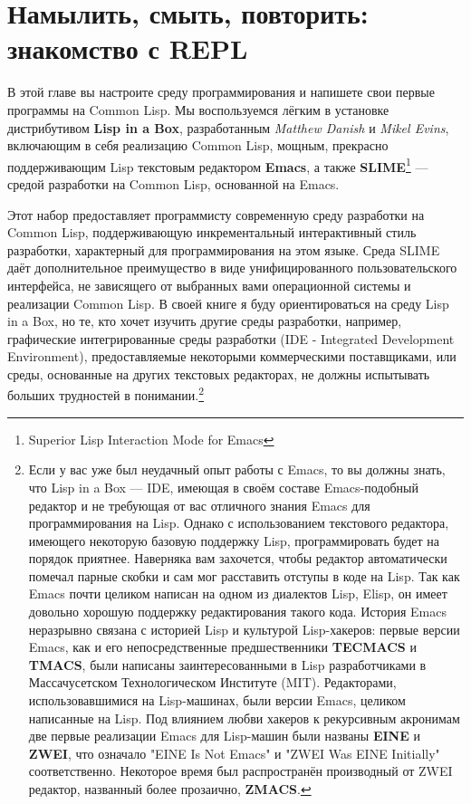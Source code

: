 \chapter{Намылить, смыть, повторить: знакомство с REPL}
\label{ch:02}

В этой главе вы настроите среду программирования и напишете свои первые программы на
Common Lisp. Мы воспользуемся лёгким в установке дистрибутивом \textbf{Lisp in a Box},
разработанным \textit{Matthew Danish} и \textit{Mikel Evins}, включающим в себя реализацию
Common Lisp, мощным, прекрасно поддерживающим Lisp текстовым редактором \textbf{Emacs}, а
также \textbf{SLIME}\footnote{Superior Lisp Interaction Mode for Emacs} --- средой
разработки на Common Lisp, основанной на Emacs.

Этот набор предоставляет программисту современную среду разработки на Common Lisp,
поддерживающую инкрементальный интерактивный стиль разработки, характерный для
программирования на этом языке. Среда SLIME даёт дополнительное преимущество в виде
унифицированного пользовательского интерфейса, не зависящего от выбранных вами
операционной системы и реализации Common Lisp. В своей книге я буду ориентироваться на
среду Lisp in a Box, но те, кто хочет изучить другие среды разработки, например,
графические интегрированные среды разработки (IDE - Integrated Development Environment),
предоставляемые некоторыми коммерческими поставщиками, или среды, основанные на других
текстовых редакторах, не должны испытывать больших трудностей в понимании.\footnote{Если у
  вас уже был неудачный опыт работы с Emacs, то вы должны знать, что Lisp in a Box ---
  IDE, имеющая в своём составе Emacs-подобный редактор и не требующая от вас отличного
  знания Emacs для программирования на Lisp. Однако с использованием текстового редактора,
  имеющего некоторую базовую поддержку Lisp, программировать будет на порядок
  приятнее. Наверняка вам захочется, чтобы редактор автоматически помечал парные скобки и
  сам мог расставить отступы в коде на Lisp. Так как Emacs почти целиком написан на одном
  из диалектов Lisp, Elisp, он имеет довольно хорошую поддержку редактирования такого
  кода. История Emacs неразрывно связана с историей Lisp и культурой Lisp-хакеров: первые
  версии Emacs, как и его непосредственные предшественники \textbf{TECMACS} и
  \textbf{TMACS}, были написаны заинтересованными в Lisp разработчиками в Массачусетском
  Технологическом Институте (MIT). Редакторами, использовавшимися на Lisp-машинах, были
  версии Emacs, целиком написанные на Lisp. Под влиянием любви хакеров к рекурсивным
  акронимам две первые реализации Emacs для Lisp-машин были названы \textbf{EINE} и
  \textbf{ZWEI}, что означало "EINE Is Not Emacs" и "ZWEI Was EINE Initially"
  соответственно. Некоторое время был распространён производный от ZWEI редактор,
  названный более прозаично, \textbf{ZMACS}.}

